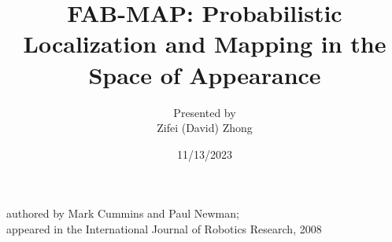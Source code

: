 \documentclass[dvipsnames, handout]{beamer}
\newcommand{\1}{\mathds{1}}	%
\begin{document}


\title{FAB-MAP: Probabilistic Localization and Mapping in the Space of Appearance}
\author{Presented by\\ Zifei (David) Zhong\vspace{-.3cm}}

\date{11/13/2023}
\begin{frame}
\titlepage
\vspace{1.2cm}

\begin{center}
{\begin{spacing}{1.2}\scriptsize 
authored by Mark Cummins and Paul Newman;\\
appeared in the International Journal of Robotics Research, 2008
\end{spacing}}
\end{center}
\end{frame}


\end{document}
